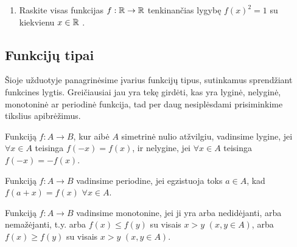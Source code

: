 \begin{enumerate}
  \item Raskite visas funkcijas $f:\mathbb R\to\mathbb R$ tenkinančias lygybę $f(x)^2=1$
    su kiekvienu $x\in\mathbb R$ .

\end{enumerate}

\newpage
\subsection{Funkcijų tipai}

Šioje užduotyje panagrinėsime įvarius funkcijų tipus, sutinkamus sprendžiant
funkcines lygtis. Greičiausiai jau yra tekę girdėti, kas yra lyginė,
nelyginė, monotoninė ar periodinė funkcija, tad per daug nesiplėsdami
prisiminkime tikslius apibrėžimus.

\begin{api}
Funkciją $f:A\to B$, kur aibė $A$ simetrinė nulio atžvilgiu,
vadinsime lygine, jei $\forall x \in A$ teisinga $f(-x)=f(x) $, ir nelygine,
jei $\forall x \in A$ teisinga $f(-x) = -f(x)$.
\end{api}

\begin{api}
Funkciją $f:A\to B$ vadinsime periodine, jei egzistuoja toks $a\in A$, kad
$f(a+x)=f(x)$ $\forall x\in A$.
\end{api}

\begin{api}
Funkciją $f:A\to B$ vadinsime monotonine, jei ji yra arba nedidėjanti, arba
nemažėjanti, t.y. arba $f(x)\leq f(y)$ su visais $x>y$ $(x,y\in A)$, arba
$f(x)\geq f(y)$ su visais $x>y$ $(x,y \in A)$.
\end{api}


